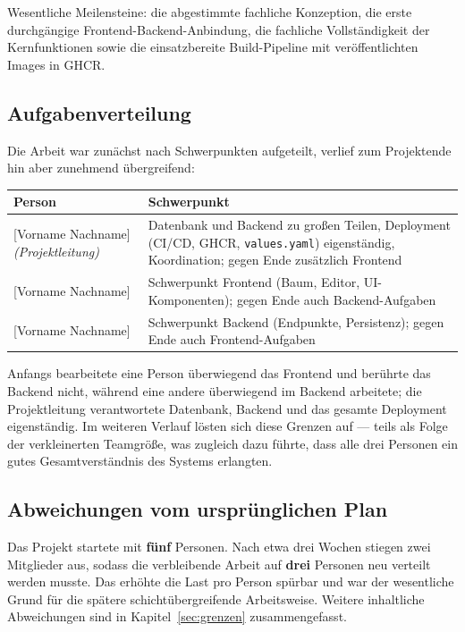 \documentclass[11pt,a4paper]{article}
\begin{document}
Wesentliche Meilensteine: die abgestimmte fachliche Konzeption, die erste
durchgängige Frontend-Backend-Anbindung, die fachliche Vollständigkeit der
Kernfunktionen sowie die einsatzbereite Build-Pipeline mit veröffentlichten
Images in GHCR.

\subsection{Aufgabenverteilung}
Die Arbeit war zunächst nach Schwerpunkten aufgeteilt, verlief zum Projektende hin
aber zunehmend übergreifend:

\begin{center}
\begin{tabularx}{\linewidth}{@{}l Y@{}}
\toprule
\textbf{Person} & \textbf{Schwerpunkt} \\
\midrule
{}[Vorname Nachname] \textit{(Projektleitung)} & Datenbank und Backend zu großen
Teilen, Deployment (CI/CD, GHCR, \texttt{values.yaml}) eigenständig,
Koordination; gegen Ende zusätzlich Frontend \\
{}[Vorname Nachname] & Schwerpunkt Frontend (Baum, Editor, UI-Komponenten); gegen
Ende auch Backend-Aufgaben \\
{}[Vorname Nachname] & Schwerpunkt Backend (Endpunkte, Persistenz); gegen Ende
auch Frontend-Aufgaben \\
\bottomrule
\end{tabularx}
\end{center}

Anfangs bearbeitete eine Person überwiegend das Frontend und berührte das Backend
nicht, während eine andere überwiegend im Backend arbeitete; die Projektleitung
verantwortete Datenbank, Backend und das gesamte Deployment eigenständig. Im
weiteren Verlauf lösten sich diese Grenzen auf --- teils als Folge der
verkleinerten Teamgröße, was zugleich dazu führte, dass alle drei Personen ein
gutes Gesamtverständnis des Systems erlangten.

\subsection{Abweichungen vom ursprünglichen Plan}
Das Projekt startete mit \textbf{fünf} Personen. Nach etwa drei Wochen stiegen
zwei Mitglieder aus, sodass die verbleibende Arbeit auf \textbf{drei} Personen neu
verteilt werden musste. Das erhöhte die Last pro Person spürbar und war der
wesentliche Grund für die spätere schichtübergreifende Arbeitsweise. Weitere
inhaltliche Abweichungen sind in Kapitel~\ref{sec:grenzen} zusammengefasst.
\end{document}
